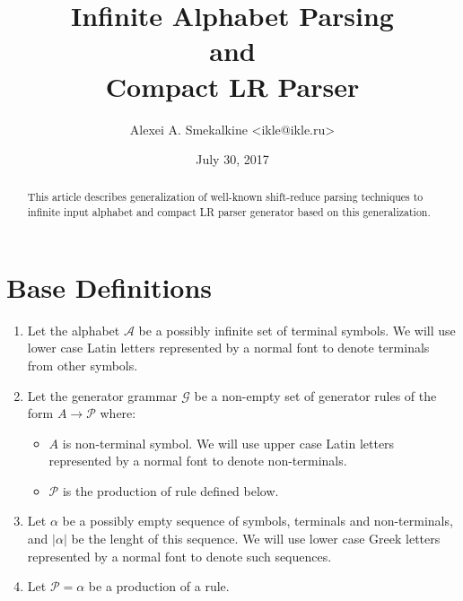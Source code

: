 

\title{Infinite Alphabet Parsing \\ and \\ Compact LR Parser}
\date{July 30, 2017}
\author{Alexei A. Smekalkine <ikle@ikle.ru>}



\maketitle

\begin{abstract}
This article describes generalization of well-known shift-reduce
parsing techniques to infinite input alphabet and compact LR parser
generator based on this generalization.
\end{abstract}

\section{Base Definitions}
\def\A{\mathcal{A}}
\def\G{\mathcal{G}}
\def\P{\mathcal{P}}

\begin{enumerate}
\item	Let the alphabet $\A$ be a possibly infinite set of terminal
	symbols. We will use lower case Latin letters represented by a
	normal font to denote terminals from other symbols.

\item	Let the generator grammar $\G$ be a non-empty set of generator
	rules of the form $A \rightarrow \P$ where:
	\begin{itemize}
	\item	$A$ is non-terminal symbol. We will use upper case
		Latin letters represented by a normal font to denote
		non-terminals.

	\item	$\P$ is the production of rule defined below.
	\end{itemize}

\item	Let $\alpha$ be a possibly empty sequence of symbols, terminals
	and non-terminals, and $|\alpha|$ be the lenght of this sequence.
	We will use lower case Greek letters represented by a normal
	font to denote such sequences.

\item	Let $\P = \alpha$ be a production of a rule.
\end{enumerate}

